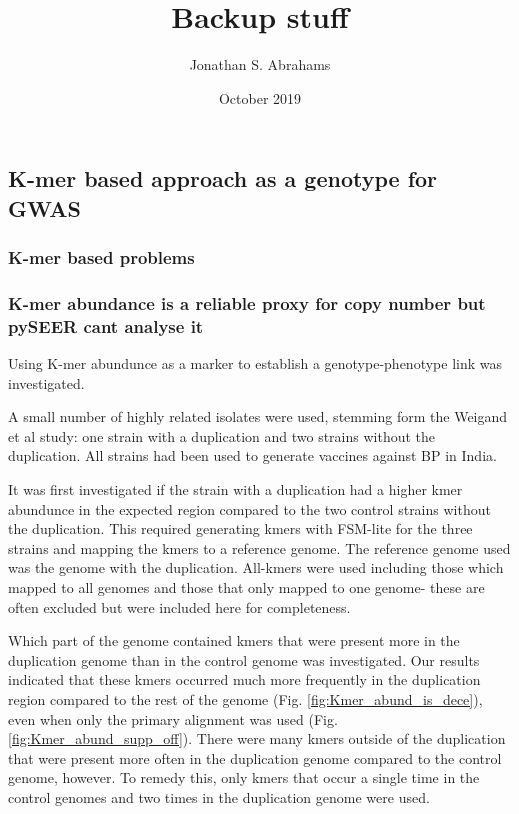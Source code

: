 \documentclass{article}
\title{Backup stuff}
\author{Jonathan S. Abrahams }
\date{October 2019}
\begin{document}
\maketitle
 
\subsection{K-mer based approach as a genotype for GWAS}


\subsubsection{K-mer based problems}

\subsubsection{K-mer abundance is a reliable proxy for copy number but pySEER cant analyse it}

Using K-mer abundunce as a marker to establish a genotype-phenotype link was investigated.

A small number of highly related isolates were used, stemming form the Weigand et al study: one strain with a duplication and two strains without the duplication. All strains had been used to generate vaccines against BP in India.

It was first investigated if the strain with a duplication had a higher kmer abundunce in the expected region compared to the two control strains without the duplication. This required generating kmers with FSM-lite for the three strains and mapping the kmers to a reference genome. The reference genome used was the genome with the duplication. All-kmers were used including those which mapped to all genomes and those that only mapped to one genome- these are often excluded but were included here for completeness.

Which part of the genome contained kmers that were present more in the duplication genome than in the control genome was investigated. Our results indicated that these kmers occurred much more frequently in the duplication region compared to the rest of the genome (Fig. \ref{fig:Kmer_abund_is_dece}), even when only the primary alignment was used (Fig. \ref{fig:Kmer_abund_supp_off}). There were many kmers outside of the duplication that were present more often in the duplication genome compared to the control genome, however. To remedy this, only kmers that occur a single time in the control genomes and two times in the duplication genome were used.
\end{document}

